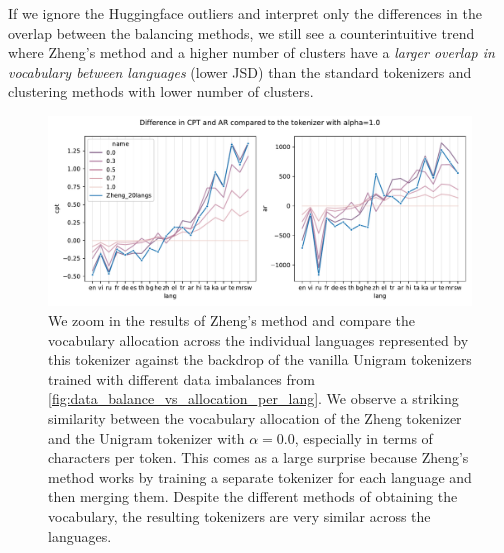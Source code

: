 If we ignore the Huggingface outliers and interpret only the differences in the overlap between the balancing methods, we still see a counterintuitive trend where Zheng's method and a higher number of clusters have a \textit{larger overlap in vocabulary between languages} (lower JSD) than the standard tokenizers and clustering methods with lower number of clusters.

\begin{figure}
    \centering
    \includegraphics[width=\textwidth]{figures/zheng_vs_alphas.pdf}
    \caption{We zoom in the results of Zheng's method and compare the vocabulary allocation across the individual languages represented by this tokenizer against the backdrop of the vanilla Unigram tokenizers trained with different data imbalances from \ref{fig:data_balance_vs_allocation_per_lang}. We observe a striking similarity between the vocabulary allocation of the Zheng tokenizer and the Unigram tokenizer with $\alpha=0.0$, especially in terms of characters per token. This comes as a large surprise because Zheng's method works by training a separate tokenizer for each language and then merging them. Despite the different methods of obtaining the vocabulary, the resulting tokenizers are very similar across the languages.}
    \label{fig:zheng_vs_alphas}
\end{figure}

